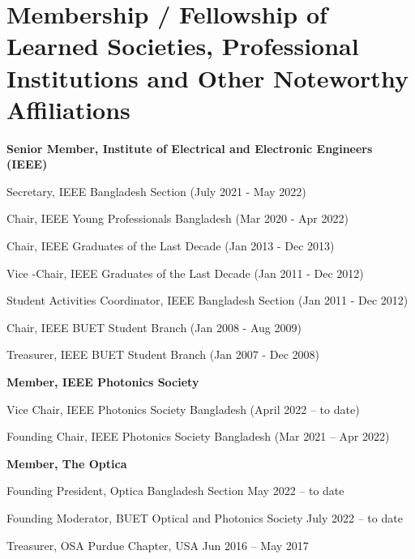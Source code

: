 \documentclass[cvauthor={Dr. Sajid Muhaimin Choudhury}]{buetcv}
\begin{document}
\section{Membership / Fellowship of Learned Societies, Professional Institutions and Other Noteworthy Affiliations}
        \begin{onecolentry}
            \textbf{Senior Member, Institute of Electrical and Electronic Engineers (IEEE)}
            \begin{highlights}
                \item Secretary, IEEE Bangladesh Section (July 2021 - May 2022)
                \item Chair, IEEE Young Professionals Bangladesh	(Mar 2020 - Apr 2022)
                \item Chair, IEEE Graduates of the Last Decade	(Jan 2013 - Dec 2013)
                \item Vice -Chair, IEEE Graduates of the Last Decade	(Jan 2011 - Dec 2012)
                \item Student Activities Coordinator, IEEE Bangladesh Section	(Jan 2011 - Dec 2012)
                \item Chair, IEEE BUET Student Branch	(Jan 2008 - Aug 2009)
                \item Treasurer, IEEE BUET Student Branch	(Jan 2007 - Dec 2008)
            \end{highlights}
        \end{onecolentry}
        \begin{onecolentry}
            \textbf{Member, IEEE Photonics Society}
            \begin{highlights}
                \item Vice Chair, IEEE Photonics Society Bangladesh	(April 2022 – to date)
                \item Founding Chair, IEEE Photonics Society Bangladesh	(Mar 2021 – Apr 2022)
                \end{highlights}
            \end{onecolentry}
            \begin{onecolentry}
                \textbf{Member, The Optica}
                \begin{highlights}
                \item Founding President, Optica Bangladesh Section	May 2022 – to date
                \item Founding Moderator, BUET Optical and Photonics Society 	July 2022 – to date 
                \item Treasurer, OSA Purdue Chapter, USA	Jun 2016 – May 2017
            \end{highlights}
            \end{onecolentry}        
\end{document}
